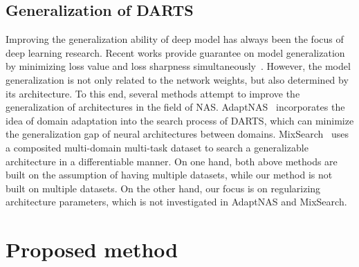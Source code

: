 \documentclass[10pt,twocolumn,letterpaper]{article}
\begin{document}
\subsection{Generalization of DARTS}
Improving the generalization ability of deep model has always been the focus of deep learning research. Recent works provide guarantee on model generalization by minimizing loss value and loss sharpness simultaneously~\cite{foret2020sharpness}. However, the model generalization is not only related to the network weights, but also determined by its architecture. To this end, several methods attempt to improve the generalization of architectures in the field of NAS. AdaptNAS~\cite{adaptNAS} incorporates the idea of domain adaptation into the search process of DARTS, which can minimize the generalization gap of neural architectures between domains. MixSearch~\cite{mixsearch} uses a composited multi-domain multi-task dataset to search a generalizable architecture in a differentiable manner. On one hand, both above methods are built on the assumption of having multiple datasets, while our method is not built on multiple datasets. On the other hand, our focus is on regularizing architecture parameters, which is not investigated in AdaptNAS and MixSearch.


\section{Proposed method} \label{sec:method}
\end{document}
